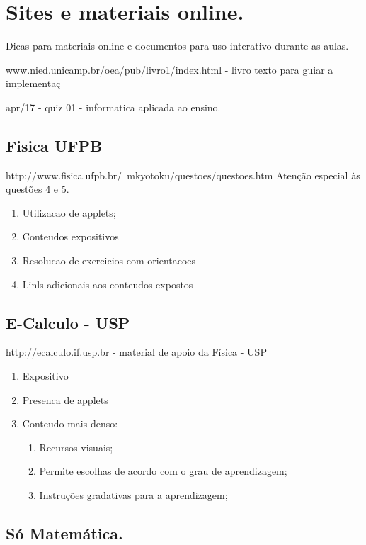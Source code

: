 \documentclass[a4paper,12pt]{article}
\begin{document}
\section{Sites e materiais online.}

Dicas para materiais online e documentos para uso interativo durante as aulas.

www.nied.unicamp.br/oea/pub/livro1/index.html - livro texto para guiar a implementa\c{c}

apr/17 - quiz 01 - informatica aplicada ao ensino.



\subsection{Fisica UFPB}

http://www.fisica.ufpb.br/~mkyotoku/questoes/questoes.htm
Aten\c{c}\~ao especial \`as quest\~oes 4 e 5.

\begin{enumerate}
\item Utilizacao de applets;
\item Conteudos expositivos
\item Resolucao de exercicios com orientacoes
\item Linls adicionais aos conteudos expostos
\end{enumerate}

\subsection{E-Calculo - USP}

http://ecalculo.if.usp.br - material de apoio da F\'isica - USP

\begin{enumerate}
\item Expositivo
\item Presenca de applets
\item Conteudo mais denso:
\begin{enumerate}
\item Recursos visuais;
\item Permite escolhas de acordo com o grau de aprendizagem;
\item Instruções gradativas para a aprendizagem;
\end{enumerate}
\end{enumerate}

\subsection{S\'o Matem\'atica.}
\end{document}
